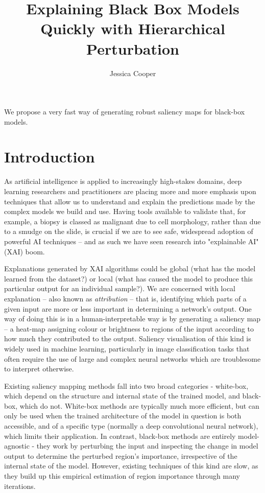\documentclass{article} %
\begin{document}
\title{Explaining Black Box Models Quickly with Hierarchical Perturbation}
\author {Jessica Cooper}
\date{}
\maketitle

\begin{abstract}

\end{abstract}

We propose a very fast way of generating robust saliency maps for black-box models.

\section{Introduction}

As artificial intelligence is applied to increasingly high-stakes domains, deep learning researchers and practitioners are placing more and more emphasis upon techniques that allow us to understand and explain the predictions made by the complex models we build and use. Having tools available to validate that, for example, a biopsy is classed as malignant due to cell morphology, rather than due to a smudge on the slide, is crucial if we are to see safe, widespread adoption of powerful AI techniques -- and as such we have seen research into "explainable AI" (XAI) boom\cite{Fouladgar2020-hz, Vilone2020-iu, Barredo_Arrieta2020-yo, Das2020-wm}.

Explanations generated by XAI algorithms could be global (what has the model learned from the dataset?) or local (what has caused the model to produce this particular output for an individual sample?). We are concerned with local explanation -- also known as \emph{attribution} -- that is, identifying which parts of a given input are more or less important in determining a network's output. One way of doing this is in a human-interpretable way is by generating a saliency map -- a heat-map assigning colour or brightness to regions of the input according to how much they contributed to the output. Saliency visualisation of this kind is widely used in machine learning, particularly in image classification tasks that often require the use of large and complex neural networks which are troublesome to interpret otherwise.

Existing saliency mapping methods fall into two broad categories - white-box, which depend on the structure and internal state of the trained model, and black-box, which do not. White-box methods are typically much more efficient, but can only be used when the trained architecture of the model in question is both accessible, and of a specific type (normally a deep convolutional neural network), which limits their application. In contrast, black-box methods are entirely model-agnostic - they work by perturbing the input and inspecting the change in model output to determine the perturbed region's importance, irrespective of the internal state of the model. However, existing techniques of this kind are slow, as they build up this empirical estimation of region importance through many iterations.
\end{document}
